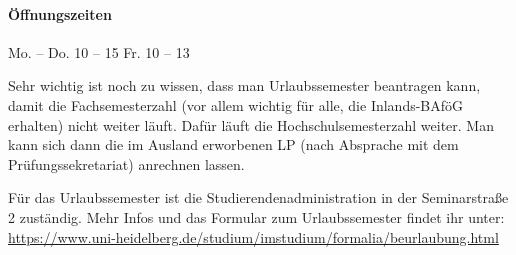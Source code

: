 \paragraph{Öffnungszeiten} Mo. -- Do. 10 -- 15 \qquad Fr. 10 -- 13

Sehr wichtig ist noch zu wissen, dass man Urlaubssemester beantragen kann, damit die Fachsemesterzahl (vor allem wichtig für alle, die Inlands-BAföG erhalten) nicht weiter läuft. Dafür läuft die Hochschulsemesterzahl weiter. Man kann sich dann die im Ausland erworbenen \gls{LP} (nach Absprache mit dem Prüfungssekretariat) anrechnen lassen.

Für das Urlaubssemester ist die Studierendenadministration in der Seminarstraße 2 zuständig. Mehr Infos und das Formular zum Urlaubssemester findet ihr unter:
\url{https://www.uni-heidelberg.de/studium/imstudium/formalia/beurlaubung.html}

